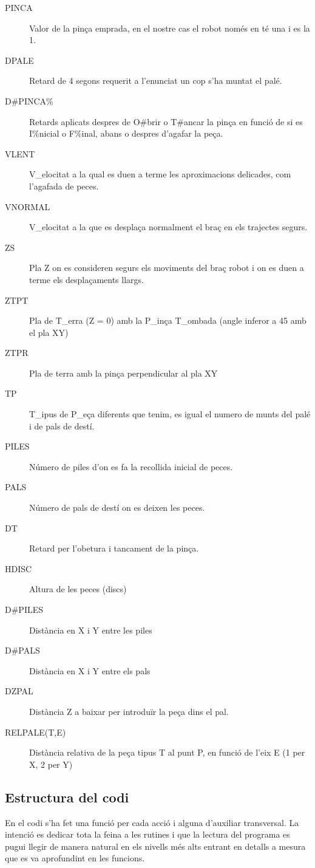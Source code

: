 \begin{description}\label{macprop}
\item [PINCA] Valor de la pinça emprada, en el nostre cas el robot només en té una i es la 1.
\item [DPALE] Retard de 4 segons requerit a l'enunciat un cop s'ha muntat el palé.
\item [D\#PINCA\%] Retards aplicats despres de O\#brir o T\#ancar la pinça en funció de si es I\%nicial o F\%inal,
abans o despres d'agafar la peça.
\item [VLENT] V\_elocitat a la qual es duen a terme les aproximacions delicades, com l'agafada de peces.
\item [VNORMAL] V\_elocitat a la que es desplaça normalment el braç en els trajectes segurs.
\item [ZS] Pla Z on es consideren segurs els moviments del braç robot i on es duen a terme els
desplaçaments llargs.
\item [ZTPT] Pla de T\_erra (Z = 0) amb la P\_inça T\_ombada (angle inferor a 45 amb el pla XY)
\item [ZTPR] Pla de terra amb la pinça perpendicular al pla XY                                                                                                           
\item [TP] T\_ipus de P\_eça diferents que tenim, es igual el numero de munts del palé i de pals
de destí.
\item [PILES] Número de piles d'on es fa la recollida inicial de peces.
\item [PALS] Número de pals de destí on es deixen les peces.
\item [DT] Retard per l'obetura i tancament de la pinça.
\item [HDISC] Altura de les peces (discs)
\item [D\#PILES] Distància en X i Y entre les piles
\item [D\#PALS] Distància en X i Y entre els pals
\item [DZPAL] Distància Z a baixar per introduïr la peça dins el pal.
\item [RELPALE(T,E)] Distància relativa de la peça tipus T al punt P, en funció de l'eix E (1 per X, 2 per Y)
\end{description}

\subsection{Estructura del codi}
En el codi s'ha fet una funció per cada acció i alguna d'auxiliar transversal.
La intenció es dedicar tota la feina a les rutines i que la lectura del programa
es pugui llegir de manera natural en els nivells més alts entrant en detalls
a mesura que es va aprofundint en les funcions.

